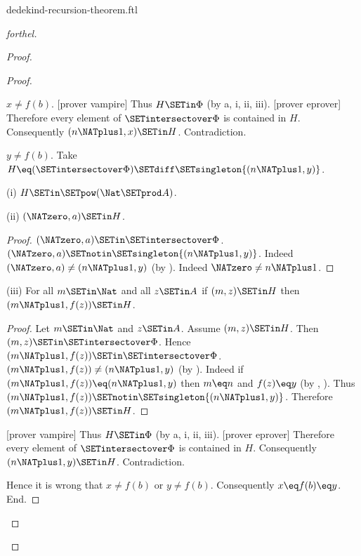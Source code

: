 \documentclass{naproche-library}
\begin{document}
\begin{smodule}[title=Dedekind's Recursion Theorem]{dedekind-recursion-theorem.ftl}
\begin{proof}[forthel]
\begin{proof}
\begin{proof}
\begin{case}{$x \neq f(b)$.}
          [prover vampire]
          Thus $H \SETin \Phi$ (by a, i, ii, iii).
          [prover eprover]
          Therefore every element of $\SETintersectover \Phi$ is contained in $H$.
          Consequently $(n \NATplus 1,x) \SETin H$.
          Contradiction.
        \end{case}

        \begin{case}{$y \neq f(b)$.}
          Take $H \eq (\SETintersectover \Phi) \SETdiff \SETsingleton{(n \NATplus 1,y)}$.

          (i) $H \SETin \SETpow(\Nat \SETprod A)$.

          (ii) $(\NATzero,a) \SETin H$.
          \begin{proof}
            $(\NATzero,a) \SETin \SETintersectover \Phi$.
            $(\NATzero,a) \SETnotin \SETsingleton{(n \NATplus 1,y)}$.
            Indeed $(\NATzero,a) \neq (n \NATplus 1,y)$ (by ).
            Indeed $\NATzero \neq n \NATplus 1$.
          \end{proof}

          (iii) For all $m \SETin \Nat$ and all $z \SETin A$ if $(m,z) \SETin H$ then $(m \NATplus 1,f(z)) \SETin H$.
          \begin{proof}
            Let $m \SETin \Nat$ and $z \SETin A$.
            Assume $(m,z) \SETin H$.
            Then $(m,z) \SETin \SETintersectover \Phi$.
            Hence $(m \NATplus 1,f(z)) \SETin \SETintersectover \Phi$.
            $(m \NATplus 1,f(z)) \neq (n \NATplus 1,y)$ (by ).
            Indeed if $(m \NATplus 1,f(z)) \eq (n \NATplus 1,y)$ then $m \eq n$ and $f(z) \eq y$ (by , ).
            Thus $(m \NATplus 1,f(z)) \SETnotin \SETsingleton{(n \NATplus 1,y)}$.
            Therefore $(m \NATplus 1,f(z)) \SETin H$.
          \end{proof}

          [prover vampire]
          Thus $H \SETin \Phi$ (by a, i, ii, iii).
          [prover eprover]
          Therefore every element of $\SETintersectover \Phi$ is contained in $H$.
          Consequently $(n \NATplus 1,y) \SETin H$.
          Contradiction.
        \end{case}

        Hence it is wrong that $x \neq f(b)$ or $y \neq f(b)$.
        Consequently $x \eq f(b) \eq y$.
      End.


\end{proof}
\end{proof}
\end{proof}
\end{smodule}
\end{document}
